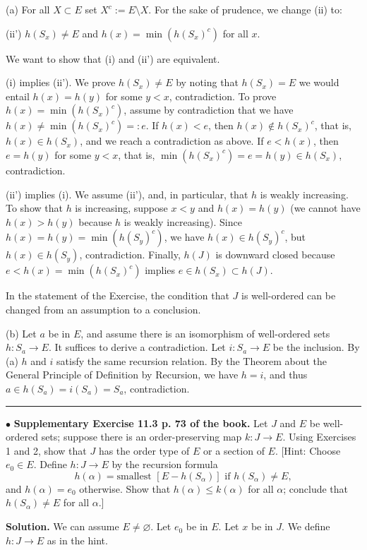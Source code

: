 \documentclass[12pt,letterpaper]{article}
\newcommand{\hs}{\bigskip\hrule\medskip}
\newcommand{\noi}{\noindent}%
\newcommand{\sm}{\setminus}
\begin{document}
\noi(a) For all $X\subset E$ set $X^c:=E\sm X$. For the sake of prudence, we change (ii) to: 

\noi(ii') $h(S_x)\ne E$ and $h(x)=\min(h(S_x)^c)$ for all $x$. 

\noi We want to show that (i) and (ii') are equivalent. 

\noi(i) implies (ii'). We prove $h(S_x)\ne E$ by noting that $h(S_x)=E$ we would entail $h(x)=h(y)$ for some $y<x$, contradiction. To prove $h(x)=\min(h(S_x)^c)$, assume by contradiction that we have $h(x)\ne\min(h(S_x)^c)=:e$. If $h(x)<e$, then $h(x)\notin h(S_x)^c$, that is, $h(x)\in h(S_x)$, and we reach a contradiction as above. If $e<h(x)$, then $e=h(y)$ for some $y<x$, that is, $\min(h(S_x)^c)=e=h(y)\in h(S_x)$, contradiction. 

\noi(ii') implies (i). We assume (ii'), and, in particular, that $h$ is weakly increasing. To show that $h$ is increasing, suppose $x<y$ and $h(x)=h(y)$ (we cannot have $h(x)>h(y)$ because $h$ is weakly increasing). Since $h(x)=h(y)=\min(h(S_y)^c)$, we have $h(x)\in h(S_y)^c$, but $h(x)\in h(S_y)$, contradiction. Finally, $h(J)$ is downward closed because $e<h(x)=\min(h(S_x)^c)$ implies $e\in h(S_x)\subset h(J)$. 

In the statement of the Exercise, the condition that $J$ is well-ordered can be changed from an assumption to a conclusion. 

\noi(b) Let $a$ be in $E$, and assume there is an isomorphism of well-ordered sets $h:S_a\to E$. It suffices to derive a contradiction. Let $i:S_a\to E$ be the inclusion. By (a) $h$ and $i$ satisfy the same recursion relation. By the Theorem about the General Principle of Definition by Recursion, we have $h=i$, and thus $a\in h(S_a)=i(S_a)=S_a$, contradiction. 

\hs 

\noi$\bullet$ \textbf{Supplementary Exercise 11.3 p. 73 of the book.} Let $J$ and $E$ be well-ordered sets; suppose there is an order-preserving map $k: J \to E$. Using Exercises 1 and 2, show that $J$ has the order type of $E$ or a section of $E$. [Hint: Choose $e_0 \in E$. Define $h: J \to E$ by the recursion formula
\[h(\alpha) = \text{smallest }[E - h(S_\alpha)] \text{ if } h(S_\alpha) \neq E,\]
and $h(\alpha) = e_0$ otherwise. Show that $h(\alpha) \leq k(\alpha)$ for all $\alpha$; conclude that $h(S_\alpha) \neq E$ for all $\alpha$.] 

\noi\textbf{Solution.} We can assume $E\ne\varnothing$. Let $e_0$ be in $E$. Let $x$ be in $J$. We define $h:J\to E$ as in the hint. 
\end{document}
